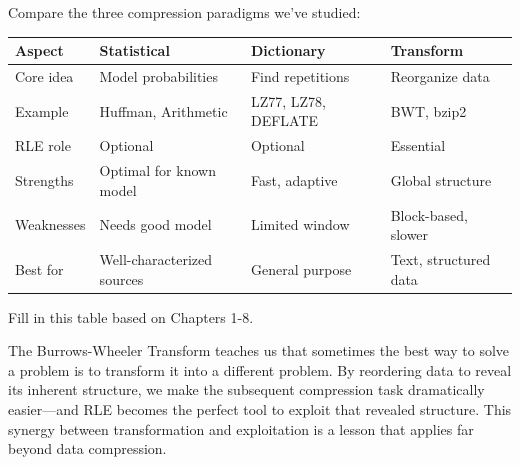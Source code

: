 \begin{exercisebox}
Compare the three compression paradigms we've studied:
\begin{center}
\begin{tabularx}{\textwidth}{@{}l X X X@{}}
\toprule
\textbf{Aspect} & \textbf{Statistical} & \textbf{Dictionary} & \textbf{Transform} \\
\midrule
Core idea & Model probabilities & Find repetitions & Reorganize data \\
Example & Huffman, Arithmetic & LZ77, LZ78, DEFLATE & BWT, bzip2 \\
RLE role & Optional & Optional & Essential \\
Strengths & Optimal for known model & Fast, adaptive & Global structure \\
Weaknesses & Needs good model & Limited window & Block-based, slower \\
Best for & Well-characterized sources & General purpose & Text, structured data \\
\bottomrule
\end{tabularx}
\end{center}
Fill in this table based on Chapters 1-8.
\end{exercisebox}

\begin{importantbox}
The Burrows-Wheeler Transform teaches us that sometimes the best way to solve a problem is to transform it into a different problem. By reordering data to reveal its inherent structure, we make the subsequent compression task dramatically easier—and RLE becomes the perfect tool to exploit that revealed structure. This synergy between transformation and exploitation is a lesson that applies far beyond data compression.
\end{importantbox}
